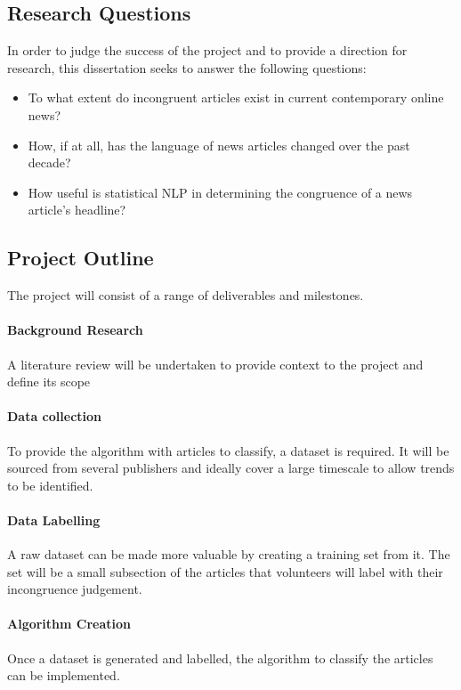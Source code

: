 \subsection{Research Questions}
In order to judge the success of the project and to provide a direction for research, this dissertation seeks to answer the following questions:
\begin{itemize}
	\item To what extent do incongruent articles exist in current contemporary online news?
	\item How, if at all, has the language of news articles changed over the past decade?
	\item How useful is statistical NLP in determining the congruence of a news article's headline?
\end{itemize}

\subsection{Project Outline}
The project will consist of a range of deliverables and milestones.
 
\paragraph{Background Research}
A literature review will be undertaken to provide context to the project and define its scope

\paragraph{Data collection}
To provide the algorithm with articles to classify, a dataset is required. It will be sourced from several publishers and ideally cover a large timescale to allow trends to be identified.

\paragraph{Data Labelling}
A raw dataset can be made more valuable by creating a training set from it. The set will be a small subsection of the articles that volunteers will label with their incongruence judgement.

\paragraph{Algorithm Creation}
Once a dataset is generated and labelled, the algorithm to classify the articles can be implemented. 

